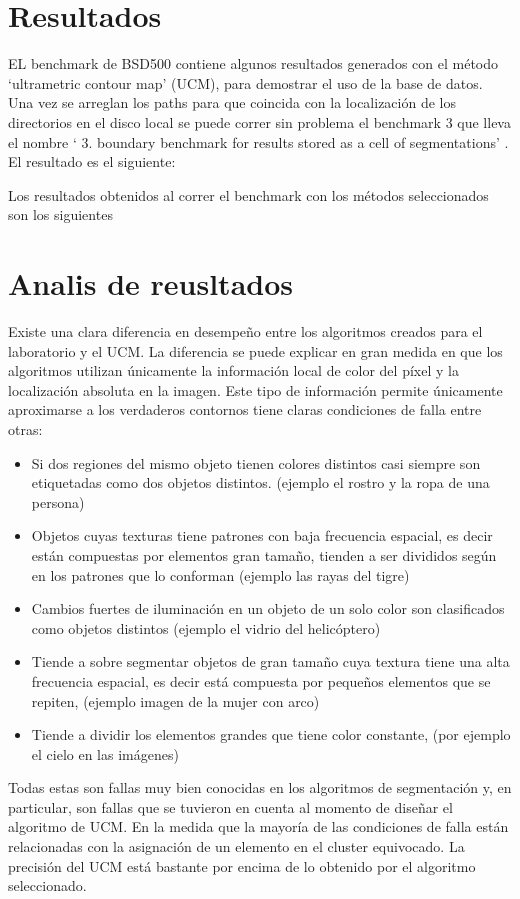 \documentclass[10pt,twocolumn,letterpaper]{article}
\begin{document}
\section{Resultados}

EL benchmark de BSD500 contiene algunos resultados generados con el método ‘ultrametric contour map’ (UCM), para demostrar el uso de la base de datos. Una vez se arreglan los paths para que coincida con la localización de los directorios en el disco local se puede correr sin problema el benchmark 3 que lleva el nombre ‘ 3. boundary benchmark for results stored as a cell of segmentations’ . El resultado es el siguiente:


Los resultados obtenidos al correr el benchmark con los métodos seleccionados son los siguientes

\section{Analis de reusltados}

Existe una clara diferencia en desempeño entre los algoritmos creados para el laboratorio y el UCM. La diferencia se puede explicar en gran medida en que los algoritmos utilizan únicamente la información local de color del píxel y la localización absoluta en la imagen. Este tipo de información permite únicamente aproximarse a los verdaderos contornos  tiene claras condiciones de falla entre otras:
\begin{itemize}
\item Si dos regiones del mismo objeto tienen  colores distintos casi siempre son etiquetadas como dos objetos distintos. (ejemplo el rostro y la ropa de una persona)
\item  Objetos cuyas texturas tiene patrones con baja frecuencia espacial, es decir están compuestas por elementos gran tamaño, tienden a ser divididos según en los patrones que lo conforman (ejemplo las rayas del tigre)
\item Cambios fuertes de iluminación en un objeto de un solo color son clasificados como objetos distintos  (ejemplo el vidrio del helicóptero)
\item Tiende a sobre segmentar objetos de gran tamaño cuya textura tiene una alta frecuencia espacial, es decir está compuesta por pequeños elementos que se repiten, (ejemplo imagen de la mujer con arco)
\item Tiende a dividir los elementos grandes que tiene color constante, (por ejemplo el cielo en las imágenes)

\end{itemize}
Todas estas son fallas muy bien conocidas en los algoritmos de segmentación y, en particular, son fallas que se tuvieron en cuenta al momento de diseñar el algoritmo de UCM. 
En la medida que la mayoría de las condiciones de falla están relacionadas con la asignación de un elemento en el cluster equivocado. La precisión del UCM está bastante por encima de lo obtenido por el algoritmo seleccionado.
\end{document}
